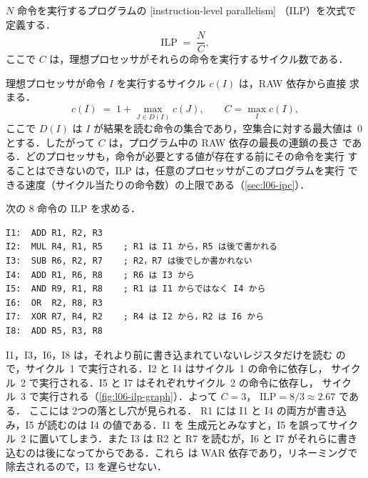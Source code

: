 \documentclass[../main.tex]{subfiles}
\begin{document}
\begin{definition}[命令レベル並列性]
  \label{def:l06-ilp}
  $N$ 命令を実行するプログラムの
  [instruction-level parallelism]%
  （ILP）を次式で定義する．
  \begin{equation}
    \text{ILP} \;=\; \frac{N}{C} ,
    \label{eq:l06-ilp}
  \end{equation}
  ここで $C$ は，理想プロセッサがそれらの命令を実行するサイクル数である．
\end{definition}

理想プロセッサが命令 $I$ を実行するサイクル $c(I)$ は，RAW 依存から直接
求まる．
\begin{equation}
  c(I) \;=\; 1 + \max_{J \in D(I)} c(J) ,
  \qquad C = \max_{I} c(I) ,
  \label{eq:l06-cycle}
\end{equation}
ここで $D(I)$ は $I$ が結果を読む命令の集合であり，空集合に対する最大値は~0
とする．したがって $C$ は，プログラム中の RAW 依存の最長の連鎖の長さ
である．どのプロセッサも，命令が必要とする値が存在する前にその命令を実行
することはできないので，ILP は，任意のプロセッサがこのプログラムを実行
できる速度（サイクル当たりの命令数）の上限である（\cref{sec:l06-ipc}）．%

\begin{example}
  \label{ex:l06-ilp}
  次の 8 命令の ILP を求める．
  \begin{lstlisting}[language={[x86masm]Assembler}, numbers=none]
I1:  ADD R1, R2, R3
I2:  MUL R4, R1, R5    ; R1 は I1 から，R5 は後で書かれる
I3:  SUB R6, R2, R7    ; R2，R7 は後でしか書かれない
I4:  ADD R1, R6, R8    ; R6 は I3 から
I5:  AND R9, R1, R8    ; R1 は I1 からではなく I4 から
I6:  OR  R2, R8, R3
I7:  XOR R7, R4, R2    ; R4 は I2 から，R2 は I6 から
I8:  ADD R5, R3, R8
\end{lstlisting}
  I1，I3，I6，I8 は，それより前に書き込まれていないレジスタだけを読む
  ので，サイクル~1 で実行される．I2 と I4 はサイクル~1 の命令に依存し，
  サイクル~2 で実行される．I5 と I7 はそれぞれサイクル~2 の命令に依存し，
  サイクル~3 で実行される（\cref{fig:l06-ilp-graph}）．よって $C=3$，
  $\text{ILP} = 8/3 \approx 2.67$ である．%
  ここには 2つの落とし穴が見られる．
  R1 には I1 と I4 の両方が書き込み，I5 が読むのは I4 の値である．I1 を
  生成元とみなすと，I5 を誤ってサイクル~2 に置いてしまう．また I3 は R2 と
  R7 を読むが，I6 と I7 がそれらに書き込むのは後になってからである．これら
  は WAR 依存であり，リネーミングで除去されるので，I3 を遅らせない．
\end{example}
\end{document}
